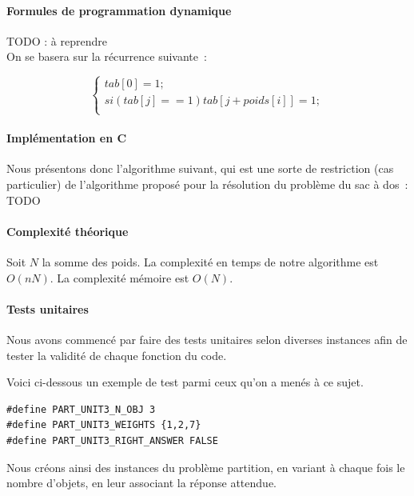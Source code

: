 \documentclass[a4paper, 12pt]{article}
\begin{document}
\paragraph{Formules de programmation dynamique}

TODO : à reprendre \\

On se basera sur la récurrence suivante~:

\begin{equation}
\begin{cases}
tab[0] = 1; \\
si ( tab[j] == 1 ) {
       tab[j + poids[i]] = 1;
     } \\
\end{cases}
\end{equation}

\paragraph{Implémentation en C}

Nous présentons donc l'algorithme suivant, qui est une sorte de
restriction (cas particulier) de l'algorithme proposé pour la
résolution du problème du sac à dos~: \\

TODO

\paragraph{Complexité théorique}

Soit $N$ la somme des poids.
La complexité en temps de notre algorithme est $O(nN)$.
La complexité mémoire est $O(N).$

\paragraph{Tests unitaires}

Nous avons commencé par faire des tests unitaires selon diverses
instances afin de tester la validité de chaque fonction du code.

Voici ci-dessous un exemple de test parmi ceux qu'on a menés à ce sujet.
\begin{lstlisting}
#define PART_UNIT3_N_OBJ 3
#define PART_UNIT3_WEIGHTS {1,2,7}
#define PART_UNIT3_RIGHT_ANSWER FALSE
\end{lstlisting}

Nous créons ainsi des instances du problème partition, en variant à chaque fois le nombre d'objets, en leur associant la réponse attendue.
\end{document}
